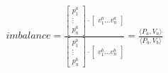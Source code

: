 \begin{align}\label{eq:imbalance}
    imbalance = 
    \frac{
    \begin{bmatrix}
        p^a_1 \\
        \vdots \\
        p^a_n
    \end{bmatrix}
    \cdot
    \begin{bmatrix}
        v^a_1 \dots v^a_n
    \end{bmatrix}
    }{
    \begin{bmatrix}
        p^b_1 \\
        \vdots \\
        p^b_n
    \end{bmatrix}
    \cdot
    \begin{bmatrix}
        v^b_1 \dots v^b_n
    \end{bmatrix}
    }
    = \frac{\langle P_a, V_a \rangle}{\langle P_b, V_b \rangle}
\end{align}
